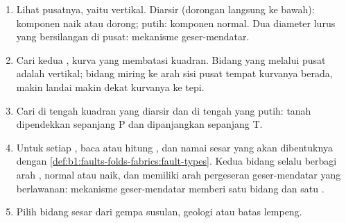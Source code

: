 \begin{method}\label{met:b1:earthquake-source:beachball}
\begin{enumerate}
  \item Lihat pusatnya, yaitu vertikal. Diarsir (dorongan langsung ke bawah): komponen naik atau dorong; putih: komponen normal. Dua diameter lurus yang bersilangan di pusat: mekanisme geser-mendatar.
  \item Cari kedua , kurva yang membatasi kuadran. Bidang yang melalui pusat adalah vertikal; bidang miring ke arah sisi pusat tempat kurvanya berada, makin landai makin dekat kurvanya ke tepi.
  \item Cari  di tengah kuadran yang diarsir dan  di tengah yang putih: tanah dipendekkan sepanjang P dan dipanjangkan sepanjang T.
  \item Untuk setiap , baca atau hitung , dan namai sesar yang akan dibentuknya dengan \cref{def:b1:faults-folds-fabrics:fault-types}. Kedua bidang selalu berbagi arah , normal atau naik, dan memiliki arah pergeseran geser-mendatar yang berlawanan: mekanisme geser-mendatar memberi satu bidang  dan satu .
  \item Pilih bidang sesar dari gempa susulan, geologi atau batas lempeng.
\end{enumerate}
\end{method}

